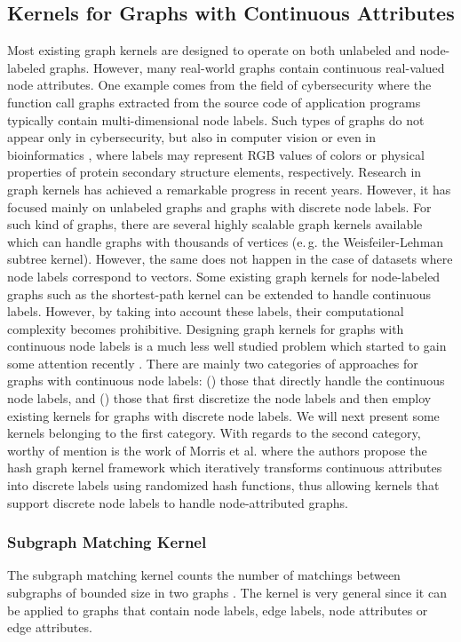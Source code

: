 \documentclass[twoside,11pt]{article}
\newcommand{\eg}{e.\,g. }
\begin{document}
\subsection{Kernels for Graphs with Continuous Attributes}
Most existing graph kernels are designed to operate on both unlabeled and node-labeled graphs.
However, many real-world graphs contain continuous real-valued node attributes.
One example comes from the field of cybersecurity where the function call graphs extracted from the source code of application programs typically contain multi-dimensional node labels. 
Such types of graphs do not appear only in cybersecurity, but also in computer vision \cite{harchaoui2007image} or even in bioinformatics \cite{borgwardt2005protein}, where labels may represent RGB values of colors or physical properties of protein secondary structure elements, respectively.
Research in graph kernels has achieved a remarkable progress in recent years.
However, it has focused mainly on unlabeled graphs and graphs with discrete node labels.
For such kind of graphs, there are several highly scalable graph kernels available which can handle graphs with thousands of vertices (\eg the Weisfeiler-Lehman subtree kernel).
However, the same does not happen in the case of datasets where node labels correspond to vectors.
Some existing graph kernels for node-labeled graphs such as the shortest-path kernel can be extended to handle continuous labels.
However, by taking into account these labels, their computational complexity becomes prohibitive.
Designing graph kernels for graphs with continuous node labels is a much less well studied problem which started to gain some attention recently \cite{kriege2012subgraph,feragen2013scalable,orsini2015graph,neumann2016propagation,morris2016faster,su2016fast,kondor2016multiscale}.
There are mainly two categories of approaches for graphs with continuous node labels: () those that directly handle the continuous node labels, and () those that first discretize the node labels and then employ existing kernels for graphs with discrete node labels.
We will next present some kernels belonging to the first category.
With regards to the second category, worthy of mention is the work of Morris et al. \citeyear{morris2016faster} where the authors propose the hash graph kernel framework which iteratively transforms continuous attributes into discrete labels using randomized hash functions, thus allowing kernels that support discrete node labels to handle node-attributed graphs.


\subsubsection{Subgraph Matching Kernel}
The subgraph matching kernel counts the number of matchings between subgraphs of bounded size in two graphs \cite{kriege2012subgraph}.
The kernel is very general since it can be applied to graphs that contain node labels, edge labels, node attributes or edge attributes.
\end{document}
